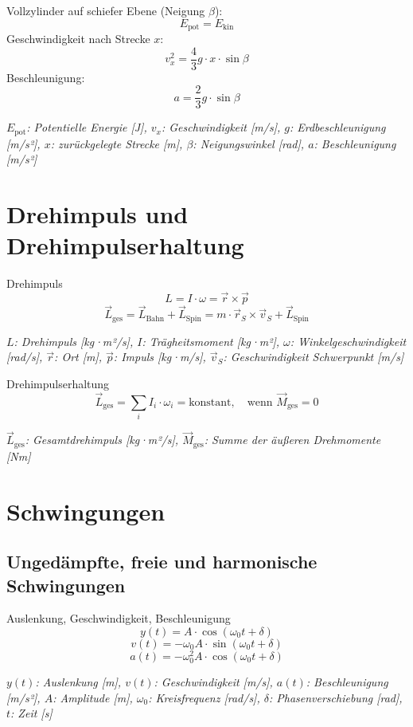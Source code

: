 \documentclass[a4paper,10pt]{article}
\newenvironment{displayformula}
{
	\begin{framed}
		\color{formulaColor}
	}
	{\end{framed}}
\newcommand{\formulalegend}[1]{%
	\par\vspace{0.5ex}%
	{{\color{legendColor}\RaggedRight\small\textit{#1}}}%
	\par\vspace{1.5ex}%
}
\begin{document}
\begin{displayformula}
	Vollzylinder auf schiefer Ebene (Neigung \( \beta \)):
	\[
	E_{\text{pot}} = E_{\text{kin}}
	\]
	Geschwindigkeit nach Strecke \( x \):
	\[
	v_x^2 = \frac{4}{3} g \cdot x \cdot \sin\beta
	\]
	Beschleunigung:
	\[
	a = \frac{2}{3} g \cdot \sin\beta
	\]
\end{displayformula}
\formulalegend{
	\( E_{\text{pot}} \): Potentielle Energie [J], \( v_x \): Geschwindigkeit [m/s], \( g \): Erdbeschleunigung [m/s²], \( x \): zurückgelegte Strecke [m], \( \beta \): Neigungswinkel [rad], \( a \): Beschleunigung [m/s²]
}

\section{Drehimpuls und Drehimpulserhaltung}

\begin{displayformula}
	Drehimpuls
	\[
	L = I \cdot \omega = \vec{r} \times \vec{p}
	\]
	\[
	\vec{L}_{\text{ges}} = \vec{L}_{\text{Bahn}} + \vec{L}_{\text{Spin}} = m \cdot \vec{r}_S \times \vec{v}_S + \vec{L}_{\text{Spin}}
	\]
\end{displayformula}
\formulalegend{
	\( L \): Drehimpuls [kg·m²/s], \( I \): Trägheitsmoment [kg·m²], \( \omega \): Winkelgeschwindigkeit [rad/s], \( \vec{r} \): Ort [m], \( \vec{p} \): Impuls [kg·m/s], \( \vec{v}_S \): Geschwindigkeit Schwerpunkt [m/s]
}

\begin{displayformula}
	Drehimpulserhaltung
	\[
	\vec{L}_{\text{ges}} = \sum_i I_i \cdot \omega_i = \text{konstant}, \quad \text{wenn } \vec{M}_{\text{ges}} = 0
	\]
\end{displayformula}
\formulalegend{
	\( \vec{L}_{\text{ges}} \): Gesamtdrehimpuls [kg·m²/s], \( \vec{M}_{\text{ges}} \): Summe der äußeren Drehmomente [Nm]
}

\section{Schwingungen}

\subsection{Ungedämpfte, freie und harmonische Schwingungen}

\begin{displayformula}
	Auslenkung, Geschwindigkeit, Beschleunigung
	\[
	y(t) = A \cdot \cos(\omega_0 t + \delta)
	\]
	\[
	v(t) = -\omega_0 A \cdot \sin(\omega_0 t + \delta)
	\]
	\[
	a(t) = -\omega_0^2 A \cdot \cos(\omega_0 t + \delta)
	\]
\end{displayformula}
\formulalegend{
	\( y(t) \): Auslenkung [m], \( v(t) \): Geschwindigkeit [m/s], \( a(t) \): Beschleunigung [m/s²], \( A \): Amplitude [m], \( \omega_0 \): Kreisfrequenz [rad/s], \( \delta \): Phasenverschiebung [rad], \( t \): Zeit [s]
}
\end{document}
